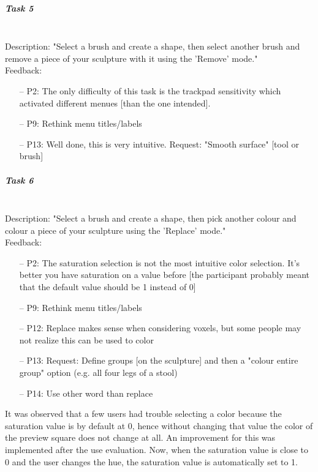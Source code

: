 \subparagraph{Task 5} \hfill \\
Description: "Select a brush and create a shape, then select another brush and remove a piece of your sculpture with it using the 'Remove' mode."\\
Feedback:
\begin{enumerate} \setlength\itemsep{-0.5em}
	\item[--] P2: The only difficulty of this task is the trackpad sensitivity which activated different menues [than the one intended].
	\item[--] P9: Rethink menu titles/labels
	\item[--] P13: Well done, this is very intuitive. Request: "Smooth surface" [tool or brush]
\end{enumerate}

\subparagraph{Task 6} \hfill \\
Description: "Select a brush and create a shape, then pick another colour and colour a piece of your sculpture using the 'Replace' mode."\\
Feedback:
\begin{enumerate} \setlength\itemsep{-0.5em}
	\item[--] P2: The saturation selection is not the most intuitive color selection. It's better you have saturation on a value before [the participant probably meant that the default value should be 1 instead of 0]
	\item[--] P9: Rethink menu titles/labels
	\item[--] P12: Replace makes sense when considering voxels, but some people may not realize this can be used to color
	\item[--] P13: Request: Define groups [on the sculpture] and then a "colour entire group" option (e.g. all four legs of a stool)
	\item[--] P14: Use other word than replace
\end{enumerate}
It was observed that a few users had trouble selecting a color because the saturation value is by default at 0, hence without changing that value the color of the preview square does not change at all. An improvement for this was implemented after the use evaluation. Now, when the saturation value is close to 0 and the user changes the hue, the saturation value is automatically set to 1.

